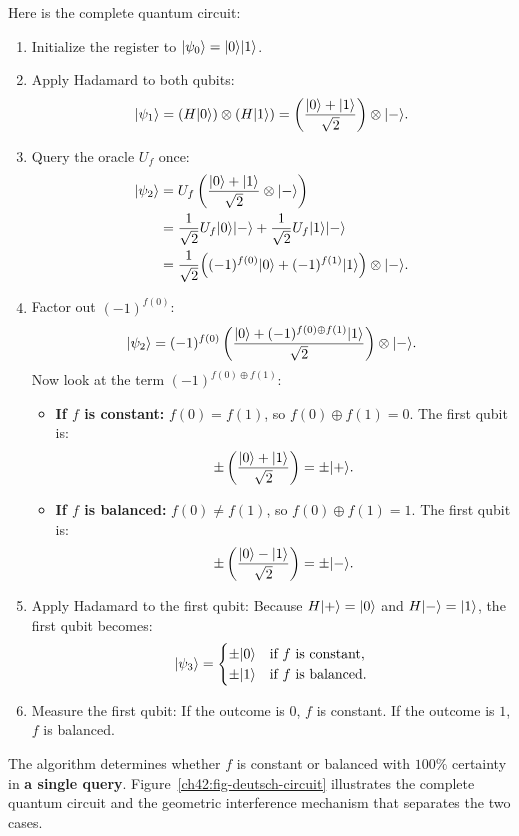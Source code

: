Here is the complete quantum circuit:
\begin{enumerate}
  \item Initialize the register to $\lvert \psi_0 \rangle = \lvert 0 \rangle\lvert 1 \rangle$.
  \item Apply Hadamard to both qubits:
  \[
    \lvert \psi_1 \rangle = (H\lvert 0 \rangle) \otimes (H\lvert 1 \rangle)
    = \left(\frac{\lvert 0 \rangle + \lvert 1 \rangle}{\sqrt{2}}\right) \otimes \lvert - \rangle.
  \]
  \item Query the oracle $U_f$ once:
  \begin{align*}
    \lvert \psi_2 \rangle &= U_f \left(\frac{\lvert 0 \rangle + \lvert 1 \rangle}{\sqrt{2}} \otimes \lvert - \rangle\right) \\
    &= \frac{1}{\sqrt{2}} U_f\lvert 0 \rangle\lvert - \rangle + \frac{1}{\sqrt{2}} U_f\lvert 1 \rangle\lvert - \rangle \\
    &= \frac{1}{\sqrt{2}}\Big((-1)^{f(0)}\lvert 0 \rangle + (-1)^{f(1)}\lvert 1 \rangle\Big) \otimes \lvert - \rangle.
  \end{align*}
  \item Factor out $(-1)^{f(0)}$:
  \[
    \lvert \psi_2 \rangle = (-1)^{f(0)} \left(\frac{\lvert 0 \rangle + (-1)^{f(0)\oplus f(1)}\lvert 1 \rangle}{\sqrt{2}}\right) \otimes \lvert - \rangle.
  \]
  Now look at the term $(-1)^{f(0)\oplus f(1)}$:
  \begin{itemize}
    \item \textbf{If $f$ is constant:} $f(0) = f(1)$, so $f(0)\oplus f(1) = 0$. The first qubit is:
    \[
      \pm \left(\frac{\lvert 0 \rangle + \lvert 1 \rangle}{\sqrt{2}}\right) = \pm \lvert + \rangle.
    \]
    \item \textbf{If $f$ is balanced:} $f(0) \ne f(1)$, so $f(0)\oplus f(1) = 1$. The first qubit is:
    \[
      \pm \left(\frac{\lvert 0 \rangle - \lvert 1 \rangle}{\sqrt{2}}\right) = \pm \lvert - \rangle.
    \]
  \end{itemize}
  \item Apply Hadamard to the first qubit:
  Because $H\lvert + \rangle = \lvert 0 \rangle$ and $H\lvert - \rangle = \lvert 1 \rangle$, the first qubit becomes:
  \[
    \lvert \psi_3 \rangle = \begin{cases}
      \pm\lvert 0 \rangle & \text{if } f \text{ is constant}, \\
      \pm\lvert 1 \rangle & \text{if } f \text{ is balanced}.
    \end{cases}
  \]
  \item Measure the first qubit:
  If the outcome is $0$, $f$ is constant. If the outcome is $1$, $f$ is balanced.
\end{enumerate}

The algorithm determines whether $f$ is constant or balanced with $100\%$ certainty
in \textbf{a single query}. Figure~\ref{ch42:fig-deutsch-circuit} illustrates the complete quantum circuit and the geometric interference mechanism that separates the two cases.

